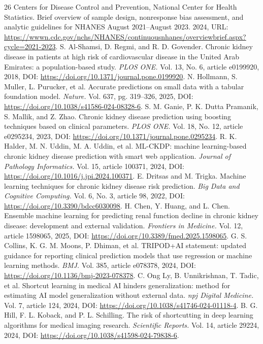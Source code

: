 \documentclass[12pt]{article}
\begin{document}
\begin{thebibliography}{26}
 Centers for Disease Control and Prevention, National Center for Health Statistics. Brief overview of sample design, nonresponse bias assessment, and analytic guidelines for NHANES August 2021--August 2023. 2024, URL: \url{https://wwwn.cdc.gov/nchs/NHANES/continuousnhanes/overviewbrief.aspx?cycle=2021-2023}.
 S. Al-Shamsi, D. Regmi, and R. D. Govender. Chronic kidney disease in patients at high risk of cardiovascular disease in the United Arab Emirates: a population-based study. \emph{PLOS ONE.} Vol. 13, No. 6, article e0199920, 2018, DOI: \url{https://doi.org/10.1371/journal.pone.0199920}.
 N. Hollmann, S. Muller, L. Purucker, et al. Accurate predictions on small data with a tabular foundation model. \emph{Nature.} Vol. 637, pg. 319--326, 2025, DOI: \url{https://doi.org/10.1038/s41586-024-08328-6}.
 S. M. Ganie, P. K. Dutta Pramanik, S. Mallik, and Z. Zhao. Chronic kidney disease prediction using boosting techniques based on clinical parameters. \emph{PLOS ONE.} Vol. 18, No. 12, article e0295234, 2023, DOI: \url{https://doi.org/10.1371/journal.pone.0295234}.
 R. K. Halder, M. N. Uddin, M. A. Uddin, et al. ML-CKDP: machine learning-based chronic kidney disease prediction with smart web application. \emph{Journal of Pathology Informatics.} Vol. 15, article 100371, 2024, DOI: \url{https://doi.org/10.1016/j.jpi.2024.100371}.
 E. Dritsas and M. Trigka. Machine learning techniques for chronic kidney disease risk prediction. \emph{Big Data and Cognitive Computing.} Vol. 6, No. 3, article 98, 2022, DOI: \url{https://doi.org/10.3390/bdcc6030098}.
 H. Chen, Y. Huang, and L. Chen. Ensemble machine learning for predicting renal function decline in chronic kidney disease: development and external validation. \emph{Frontiers in Medicine.} Vol. 12, article 1598065, 2025, DOI: \url{https://doi.org/10.3389/fmed.2025.1598065}.
 G. S. Collins, K. G. M. Moons, P. Dhiman, et al. TRIPOD+AI statement: updated guidance for reporting clinical prediction models that use regression or machine learning methods. \emph{BMJ.} Vol. 385, article e078378, 2024, DOI: \url{https://doi.org/10.1136/bmj-2023-078378}.
 C. Ong Ly, B. Unnikrishnan, T. Tadic, et al. Shortcut learning in medical AI hinders generalization: method for estimating AI model generalization without external data. \emph{npj Digital Medicine.} Vol. 7, article 124, 2024, DOI: \url{https://doi.org/10.1038/s41746-024-01118-4}.
 B. G. Hill, F. L. Koback, and P. L. Schilling. The risk of shortcutting in deep learning algorithms for medical imaging research. \emph{Scientific Reports.} Vol. 14, article 29224, 2024, DOI: \url{https://doi.org/10.1038/s41598-024-79838-6}.

\end{thebibliography}
\end{document}
